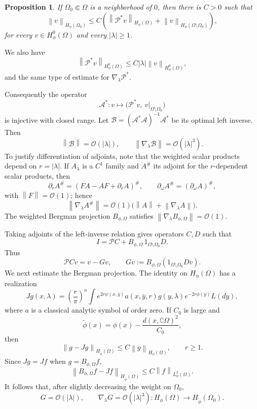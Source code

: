 \documentclass[11pt,a4paper]{article}
\newcommand{\cO}{\mathcal O}
\newcommand{\norm}[1]{\left\lVert #1\right\rVert}
\numberwithin{equation}{section}
\newtheorem{proposition}[theorem]{Proposition}
\theoremstyle{remark}
\begin{document}
\begin{proposition}
If $\Omega_0\Subset\Omega$ is a neighborhood of $0$, then there is $C>0$ such that
\begin{equation}
\norm v_{H_\phi(\Omega_0)}\le C\left(
\norm{\mathcal P^*v}_{H_\phi(\Omega)}+
\norm v_{H_\phi(\Omega\setminus\Omega_0)}\right),
\end{equation}
for every $v\in H^0_\phi(\Omega)$ and every $|\lambda|\ge1$.
\end{proposition}
We also have
\begin{equation}
\norm{\mathcal P^*v}_{H^0_\phi(\Omega)}
\le C|\lambda|\norm v_{H^0_\phi(\Omega)},
\end{equation}
and the same type of estimate for $\nabla_\lambda\mathcal P^*$.

Consequently the operator
\[
\mathcal A^*:v\longmapsto\bigl(\mathcal P^*v,\ v|_{\Omega\setminus\Omega_0}\bigr)
\]
is injective with closed range. Let $\mathcal B=(\mathcal A^*\mathcal A)^{-1}\mathcal A^*$ be its optimal left inverse. Then
\[
\norm{\mathcal B}=\cO(|\lambda|),
\qquad
\norm{\nabla_\lambda\mathcal B}=\cO(|\lambda|^3).
\]
To justify differentiation of adjoints, note that the weighted scalar products depend on $r=|\lambda|$. If $A_\lambda$ is a $C^1$ family and $A^\#$ its adjoint for the $r$-dependent scalar products, then
\[
\partial_rA^\#=(FA-AF+\partial_rA)^\#,
\qquad
\partial_\omega A^\#=(\partial_\omega A)^\#,
\]
with $\norm F=\cO(1)$; hence
\[
\norm{\nabla_\lambda A^\#}=\cO(1)
\bigl(\norm A+\norm{\nabla_\lambda A}\bigr).
\]
The weighted Bergman projection $B_{\phi,\Omega}$ satisfies $\norm{\nabla_\lambda B_{\phi,\Omega}}=\cO(1)$.

Taking adjoints of the left-inverse relation gives operators $C,D$ such that
\begin{equation}
I=\mathcal P C+B_{\phi,\Omega}\,1_{\Omega\setminus\Omega_0}D.
\end{equation}
Thus
\[
\mathcal P Cv=v-Gv,
\qquad Gv:=B_{\phi,\Omega}(1_{\Omega\setminus\Omega_0}Dv).
\]
We next estimate the Bergman projection. The identity on $H_\phi(\Omega)$ has a realization
\begin{equation}
Jg(x,\lambda)=\left(\frac r\pi\right)^n
\int e^{2r\psi(x,\bar y)}a(x,\bar y,r)g(y,\lambda)e^{-2r\phi(y)}L(dy),
\end{equation}
where $a$ is a classical analytic symbol of order zero. If $C_0$ is large and
\[
\widetilde\phi(x)=\phi(x)-\frac{d(x,\complement\Omega)^2}{C_0},
\]
then
\begin{equation}
\norm{g-Jg}_{H_{\widetilde\phi}(\Omega)}
\le C\norm g_{H_\phi(\Omega)},\qquad r\ge1.
\end{equation}
Since $Jg=Jf$ when $g=B_{\phi,\Omega}f$,
\begin{equation}
\norm{B_{\phi,\Omega}f-Jf}_{H_{\widetilde\phi}(\Omega)}
\le C\norm f_{L^2_\phi(\Omega)}.
\end{equation}
It follows that, after slightly decreasing the weight on $\Omega_0$,
\[
G=\cO(|\lambda|),
\qquad
\nabla_\lambda G=\cO(|\lambda|^3):
H_\phi(\Omega)\to H_{\widetilde\phi}(\Omega_0).
\]
\end{document}
